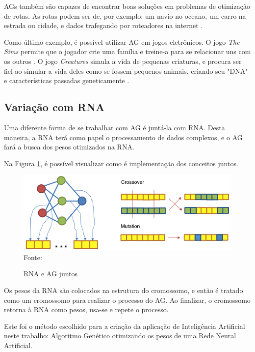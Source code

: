 \documentclass[
	12pt,					%
	openright,				%
	oneside,				%
	a4paper,				%
	bibjustif,				%
	chapter=TITLE,			%
	english,				%
	brazil,					%
	]{abntex2}
\newcommand{\source}[1]{\small Fonte: {#1}}
\begin{document}
	AGs também são capazes de encontrar boas soluções em problemas de otimização de rotas.
	As rotas podem ser de, por exemplo:
	um navio no oceano,
	um carro na estrada ou cidade,
	e dados trafegando por roteadores na internet
	\cite{brainz}.
	
	Como último exemplo,
	é possível utilizar AG em jogos eletrônicos.
	O jogo \textit{The Sims} permite que o jogador crie uma família e treine-a para se relacionar uns com os outros
	\cite{brainz}.
	O jogo \textit{Creatures} simula a vida de pequenas criaturas,
	e procura ser fiel ao simular a vida deles como se fossem pequenos animais,
	criando seu "DNA"{} e características passadas geneticamente
	\cite{aigamedev}.
	
	\FloatBarrier
	\subsection{Variação com RNA}
	Uma diferente forma de se trabalhar com AG é juntá-la com RNA.
	Desta maneira, a RNA terá como papel o processamento de dados complexos,
	e o AG fará a busca dos pesos otimizados na RNA.
	
	Na Figura \ref{fig:nn-ag}, é possível visualizar como é implementação dos conceitos juntos.
	
	\begin{figure}[ht!]
		\centering
		\caption{RNA e AG juntos}
		\includegraphics[scale=0.7]{img/NeuralNetworkIntoChromosome.png}\\
		\vspace{0.5mm}
		\source{}
		\label{fig:nn-ag}
	\end{figure}
	
	Os pesos da RNA são colocados na estrutura do cromossomo,
	e então é tratado como um cromossomo para realizar o processo do AG.
	Ao finalizar, o cromossomo retorna à RNA como pesos,
	usa-se e repete o processo.
	
	Este foi o método escolhido para a criação da aplicação de Inteligência Artificial neste trabalho:
	Algoritmo Genético otimizando os pesos de uma Rede Neural Artificial.
\end{document}
